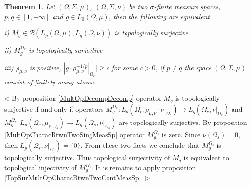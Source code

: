 \documentclass[12pt]{article}
\newtheorem{theorem}{Theorem}[subsection]
\newenvironment{proof}{\par $\triangleleft$}{$\triangleright$}
\begin{document}
\begin{theorem}\label{TopSurMultOpCharacBtwnTwoMeasSp} Let $(\Omega,\Sigma,\mu)$, $(\Omega,\Sigma,\nu)$ be two $\sigma$-finite measure spaces, $p,q\in[1,+\infty]$ and $g\in L_0(\Omega,\mu)$, then the following are equivalent

i) $M_g\in\mathcal{B}(L_p(\Omega,\mu), L_q(\Omega,\nu))$ is topologically surjective

ii) $M_g^{\Omega_c}$ is topologically surjective

iii) $\rho_{\mu,\nu}$ is positive, $|g\cdot\rho_{\mu,\nu}^{-1/p}|_{\Omega_c}|\geq c$ for some $c>0$, if $p\neq q$ the space $(\Omega,\Sigma,\mu)$ consist of finitely many atoms.
\end{theorem}
\begin{proof}
By proposition \ref{MultOpDecompDecomp} operator $M_g$ is topologically surjective if and only if operators $M_g^{\Omega_c}:L_p(\Omega_c,\rho_{\mu,\nu}\cdot\nu|_{\Omega_c})\to L_q(\Omega_c,\nu|_{\Omega_c})$ and $M_g^{\Omega_s}:L_p(\Omega_s,\mu_s|_{\Omega_s})\to L_q(\Omega_s,\nu|_{\Omega_s})$ are topologically surjective. By proposition \ref{MultOpCharacBtwnTwoSingMeasSp} operator $M_g^{\Omega_s}$ is zero. Since $\nu(\Omega_s)=0$, then $L_p(\Omega_s,\nu|_{\Omega_s})=\{0\}$. From these two facts we conclude that $M_g^{\Omega_s}$ is topologically surjective. Thus topological surjectivity of $M_g$ is equivalent to topological injectivity of  $M_g^{\Omega_c}$. It is remains to apply proposition \ref{TopSurMultOpCharacBtwnTwoContMeasSp}.
\end{proof}
\end{document}
